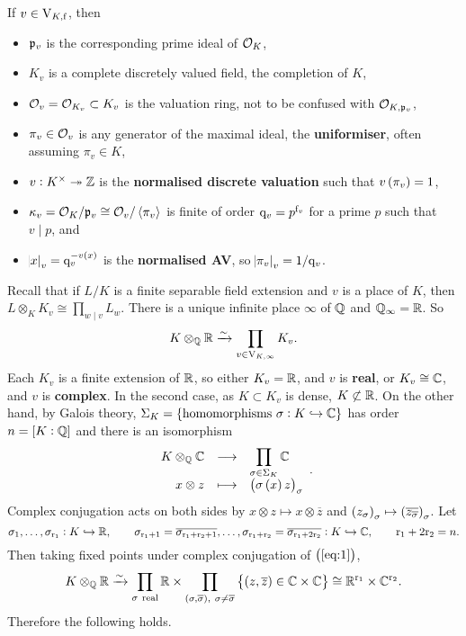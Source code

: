 \begin{notation*}
If $ v \in \mathrm{V}_{K, \mathrm{f}} $, then
\begin{itemize}
\item $ \mathfrak{p}_v $ is the corresponding prime ideal of $ \mathcal{O}_K $,
\item $ K_v $ is a complete discretely valued field, the completion of $ K $,
\item $ \mathcal{O}_v = \mathcal{O}_{K_v} \subset K_v $ is the valuation ring, not to be confused with $ \mathcal{O}_{K, \mathfrak{p}_v} $,
\item $ \pi_v \in \mathcal{O}_v $ is any generator of the maximal ideal, the \textbf{uniformiser}, often assuming $ \pi_v \in K $,
\item $ v : K^\times \twoheadrightarrow \mathbb{Z} $ is the \textbf{normalised discrete valuation} such that $ v\br{\pi_v} = 1 $,
\item $ \kappa_v = \mathcal{O}_K / \mathfrak{p}_v \cong \mathcal{O}_v / \left\langle \pi_v \right\rangle $ is finite of order $ \mathrm{q}_v = p^{\mathrm{f}_v} $ for a prime $ p $ such that $ v \mid p $, and
\item $ \abs{x}_v = \q_v^{-v\br{x}} $ is the \textbf{normalised AV}, so $ \abs{\pi_v}_v = 1 / \mathrm{q}_v $.
\end{itemize}
\end{notation*}

Recall that if $ L / K $ is a finite separable field extension and $ v $ is a place of $ K $, then $ L \otimes_K K_v \cong \prod_{w \mid v} L_w $. There is a unique infinite place $ \infty $ of $ \mathbb{Q} $ and $ \mathbb{Q}_\infty = \mathbb{R} $. So
$$ K \otimes_{\mathbb{Q}} \mathbb{R} \xrightarrow{\sim} \prod_{v \in \mathrm{V}_{K, \infty}} K_v. $$
Each $ K_v $ is a finite extension of $ \mathbb{R} $, so either $ K_v = \mathbb{R} $, and $ v $ is \textbf{real}, or $ K_v \cong \mathbb{C} $, and $ v $ is \textbf{complex}. In the second case, as $ K \subset K_v $ is dense, $ K \not\subset \mathbb{R} $. On the other hand, by Galois theory, $ \Sigma_K = \cbr{\text{homomorphisms} \ \sigma : K \hookrightarrow \CC} $ has order $ n = \sbr{K : \QQ} $ and there is an isomorphism
\begin{equation}
\label{eq:1}
\function{K \otimes_\QQ \CC}{\prod_{\sigma \in \Sigma_K} \CC}{x \otimes z}{\br{\sigma\br{x}z}_\sigma}.
\end{equation}
Complex conjugation acts on both sides by $ x \otimes z \mapsto x \otimes \overline{z} $ and $ \br{z_\sigma}_\sigma \mapsto \br{\overline{z_{\overline{\sigma}}}}_\sigma $. Let
$$ \sigma_1, \dots, \sigma_{\mathrm{r}_1} : K \hookrightarrow \mathbb{R}, \qquad \sigma_{\mathrm{r}_1 + 1} = \overline{\sigma_{\mathrm{r}_1 + \mathrm{r}_2 + 1}}, \dots, \sigma_{\mathrm{r}_1 + \mathrm{r}_2} = \overline{\sigma_{\mathrm{r}_1 + 2\mathrm{r}_2}} : K \hookrightarrow \mathbb{C}, \qquad \mathrm{r}_1 + 2\mathrm{r}_2 = n. $$
Then taking fixed points under complex conjugation of $ \br{\ref{eq:1}} $,
$$ K \otimes_\QQ \RR \xrightarrow{\sim} \prod_{\sigma \ \text{real}} \RR \times \prod_{\br{\sigma, \overline{\sigma}}, \ \sigma \ne \overline{\sigma}} \cbr{\br{z, \overline{z}} \in \CC \times \CC} \cong \RR^{\r_1} \times \CC^{\r_2}. $$
Therefore the following holds.

